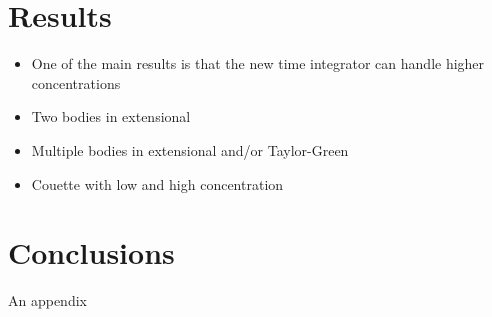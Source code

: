 \documentclass[preprint, 10pt]{elsarticle}
\begin{document}
\section{Results\label{s:results}} 

\begin{itemize}
  \item One of the main results is that the new time integrator can
    handle higher concentrations
  \item Two bodies in extensional
  \item Multiple bodies in extensional and/or Taylor-Green
  \item Couette with low and high concentration
\end{itemize}

\section{Conclusions\label{s:conclusions}}


\begin{appendices}
An appendix
\end{appendices}


 

\end{document}
